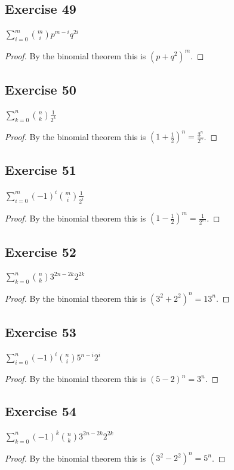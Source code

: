 \documentclass[14pt]{extarticle}
\newcommand{\dps}{\displaystyle}
\begin{document}
\subsection{Exercise 49}
\(\dps \sum_{i=0}^{m} \binom{m}{i} p^{m-i}q^{2i}\)
\begin{proof}
     By the binomial theorem this is \((p+q^2)^m\).
\end{proof}

\subsection{Exercise 50}
\(\dps \sum_{k=0}^{n} \binom{n}{k} \frac{1}{2^k}\)
\begin{proof}
     By the binomial theorem this is \((1+\frac{1}{2})^n = \frac{3^n}{2^n}\).
\end{proof}

\subsection{Exercise 51}
\(\dps \sum_{i=0}^{m} (-1)^{i} \binom{m}{i} \frac{1}{2^i}\)
\begin{proof}
     By the binomial theorem this is \((1-\frac{1}{2})^m = \frac{1}{2^m}\).
\end{proof}

\subsection{Exercise 52}
\(\dps \sum_{k=0}^{n} \binom{n}{k} 3^{2n-2k}2^{2k}\)
\begin{proof}
     By the binomial theorem this is \((3^2+2^2)^n = 13^n\).
\end{proof}

\subsection{Exercise 53}
\(\dps \sum_{i=0}^{n} (-1)^i \binom{n}{i} 5^{n-i}2^i\)
\begin{proof}
     By the binomial theorem this is \((5-2)^n = 3^n\).
\end{proof}

\subsection{Exercise 54}
\(\dps \sum_{k=0}^{n} (-1)^k \binom{n}{k} 3^{2n-2k}2^{2k}\)
\begin{proof}
     By the binomial theorem this is \((3^2-2^2)^n = 5^n\).
\end{proof}
\end{document}
